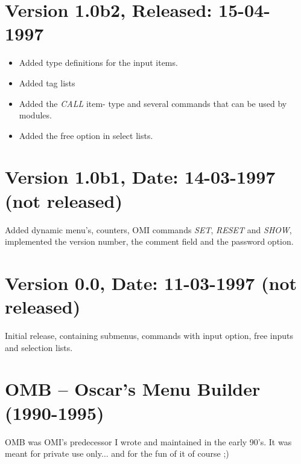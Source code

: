 \documentclass[a4paper]{book}
\begin{document}
\section*{Version 1.0b2, Released: 15-04-1997}

\begin{itemize}
\item Added type definitions for the input items.
\item Added tag lists
\item Added the \textsl{CALL} item- type and several commands that can be used by modules.
\item Added the free option in select lists.
\end{itemize}

\section*{Version 1.0b1, Date: 14-03-1997  (not released)}

Added dynamic menu's, counters, OMI commands \textsl{SET}, \textsl{RESET} and \textsl{SHOW}, implemented the version number, the comment field and the password option.

\section*{Version 0.0, Date: 11-03-1997  (not released)}

Initial release, containing submenus, commands with input option, free inputs and selection lists.

\section*{OMB -- Oscar's Menu Builder (1990-1995)}

OMB was OMI's predecessor I wrote and maintained in the early 90's. It was meant for private use only... and for the fun of it of course ;)

\cleardoublepage
\printindex
\end{document}
